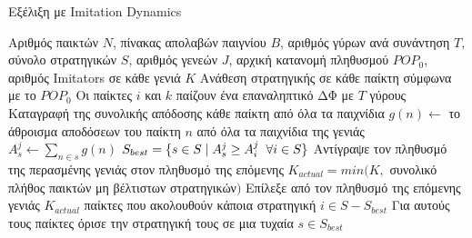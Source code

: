 \documentclass[12pt]{report}
\begin{document}
\begin{algorithm}[H]
\caption{Εξέλιξη με \foreignlanguage{english}{Imitation Dynamics}}
\label{alg:ImitationDyns}
\begin{algorithmic}[1]
\REQUIRE Αριθμός παικτών $N$, πίνακας απολαβών παιγνίου $B$, αριθμός γύρων ανά συνάντηση $T$, σύνολο στρατηγικών $S$, αριθμός γενεών $J$, αρχική κατανομή πληθυσμού $POP_0$, αριθμός \foreignlanguage{english}{Imitators} σε κάθε γενιά $K$
\STATE Ανάθεση στρατηγικής σε κάθε παίκτη σύμφωνα με το $POP_0$
        \STATE Οι παίκτες $i$ και $k$ παίζουν ένα επαναληπτικό ΔΦ με $T$ γύρους
        \STATE Καταγραφή της συνολικής απόδοσης κάθε παίκτη από όλα τα παιχνίδια
    \ENDFOR
        \STATE $g(n) \gets$ το άθροισμα αποδόσεων του παίκτη $n$ από όλα τα παιχνίδια της γενιάς
    \ENDFOR
        \STATE $A_s^j \gets \sum_{n \in s} g(n)$
    \ENDFOR
    \STATE $S_{best}=\{s \in S \mid A_s^j \geq A_i^j \hspace{0.2 cm} \forall i \in S\}$
    \STATE Αντίγραψε τον πληθυσμό της περασμένης γενιάς στον πληθυσμό της επόμενης
    \STATE $K_{actual} = min(K,$ συνολικό πλήθος παικτών μη βέλτιστων στρατηγικών$)$
    \STATE Επίλεξε από τον πληθυσμό της επόμενης γενιάς $K_{actual}$ παίκτες που ακολουθούν κάποια στρατηγική $i \in S-S_{best}$
    \STATE Για αυτούς τους παίκτες όρισε την στρατηγική τους σε μια τυχαία $s \in S_{best}$
\ENDFOR
    \end{algorithmic}
\end{algorithm}
\end{document}
